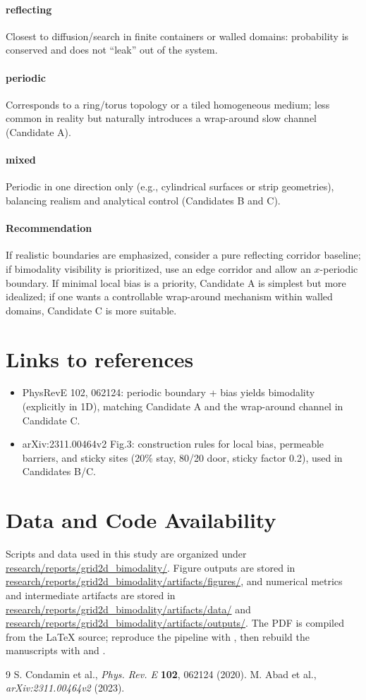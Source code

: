 \documentclass[11pt]{article}
\begin{document}
\paragraph{reflecting} Closest to diffusion/search in finite containers or walled domains: probability is conserved and does not ``leak'' out of the system.
\paragraph{periodic} Corresponds to a ring/torus topology or a tiled homogeneous medium; less common in reality but naturally introduces a wrap-around slow channel (Candidate A).
\paragraph{mixed} Periodic in one direction only (e.g., cylindrical surfaces or strip geometries), balancing realism and analytical control (Candidates B and C).
\paragraph{Recommendation} If realistic boundaries are emphasized, consider a pure reflecting corridor baseline; if bimodality visibility is prioritized, use an edge corridor and allow an $x$-periodic boundary. If minimal local bias is a priority, Candidate A is simplest but more idealized; if one wants a controllable wrap-around mechanism within walled domains, Candidate C is more suitable.

\section{Links to references}
\begin{itemize}
  \item PhysRevE 102, 062124: periodic boundary + bias yields bimodality (explicitly in 1D), matching Candidate A and the wrap-around channel in Candidate C.
  \item arXiv:2311.00464v2 Fig.3: construction rules for local bias, permeable barriers, and sticky sites (20\% stay, 80/20 door, sticky factor 0.2), used in Candidates B/C.
\end{itemize}

\section{Data and Code Availability}
Scripts and data used in this study are organized under \url{research/reports/grid2d_bimodality/}. Figure outputs are stored in \url{research/reports/grid2d_bimodality/artifacts/figures/}, and numerical metrics and intermediate artifacts are stored in \url{research/reports/grid2d_bimodality/artifacts/data/} and \url{research/reports/grid2d_bimodality/artifacts/outputs/}. The PDF is compiled from the \LaTeX{} source; reproduce the pipeline with , then rebuild the manuscripts with  and .

\begin{thebibliography}{9}
   S. Condamin et al., \emph{Phys. Rev. E} \textbf{102}, 062124 (2020).
   M. Abad et al., \emph{arXiv:2311.00464v2} (2023).
\end{thebibliography}
\end{document}
